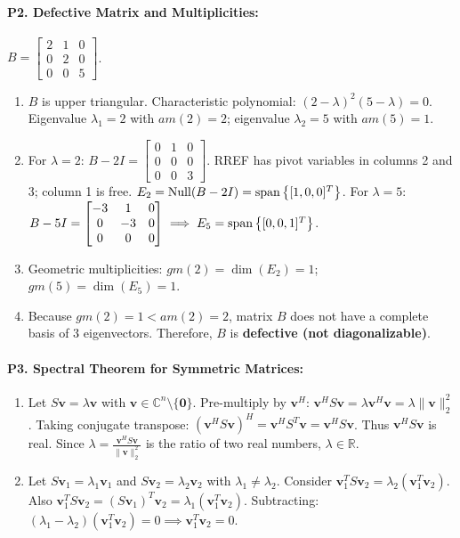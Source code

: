 \paragraph{P2. Defective Matrix and Multiplicities:}
$B = \begin{bmatrix} 2 & 1 & 0 \\ 0 & 2 & 0 \\ 0 & 0 & 5 \end{bmatrix}$.
\begin{enumerate}[label=(\alph*)]
    \item $B$ is upper triangular. Characteristic polynomial: $(2 - \lambda)^2 (5 - \lambda) = 0$.
    Eigenvalue $\lambda_1 = 2$ with $am(2) = 2$; eigenvalue $\lambda_2 = 5$ with $am(5) = 1$.
    \item For $\lambda = 2$: $B - 2I = \begin{bmatrix} 0 & 1 & 0 \\ 0 & 0 & 0 \\ 0 & 0 & 3 \end{bmatrix}$. RREF has pivot variables in columns 2 and 3; column 1 is free.
    $E_2 = \operatorname{Null}(B - 2I) = \operatorname{span}\left\{ [1, 0, 0]^T \right\}$.
    For $\lambda = 5$: $B - 5I = \begin{bmatrix} -3 & 1 & 0 \\ 0 & -3 & 0 \\ 0 & 0 & 0 \end{bmatrix} \implies E_5 = \operatorname{span}\left\{ [0, 0, 1]^T \right\}$.
    \item Geometric multiplicities: $gm(2) = \dim(E_2) = 1$; $gm(5) = \dim(E_5) = 1$.
    \item Because $gm(2) = 1 < am(2) = 2$, matrix $B$ does not have a complete basis of 3 eigenvectors. Therefore, $B$ is \textbf{defective (not diagonalizable)}.
\end{enumerate}

\paragraph{P3. Spectral Theorem for Symmetric Matrices:}
\begin{enumerate}[label=(\alph*)]
    \item Let $S\mathbf{v} = \lambda \mathbf{v}$ with $\mathbf{v} \in \mathbb{C}^n \setminus \{\mathbf{0}\}$.
    Pre-multiply by $\mathbf{v}^H$: $\mathbf{v}^H S \mathbf{v} = \lambda \mathbf{v}^H \mathbf{v} = \lambda \|\mathbf{v}\|_2^2$.
    Taking conjugate transpose: $(\mathbf{v}^H S \mathbf{v})^H = \mathbf{v}^H S^T \mathbf{v} = \mathbf{v}^H S \mathbf{v}$.
    Thus $\mathbf{v}^H S \mathbf{v}$ is real. Since $\lambda = \frac{\mathbf{v}^H S \mathbf{v}}{\|\mathbf{v}\|_2^2}$ is the ratio of two real numbers, $\lambda \in \mathbb{R}$.
    \item Let $S\mathbf{v}_1 = \lambda_1 \mathbf{v}_1$ and $S\mathbf{v}_2 = \lambda_2 \mathbf{v}_2$ with $\lambda_1 \ne \lambda_2$.
    Consider $\mathbf{v}_1^T S \mathbf{v}_2 = \lambda_2 (\mathbf{v}_1^T \mathbf{v}_2)$.
    Also $\mathbf{v}_1^T S \mathbf{v}_2 = (S\mathbf{v}_1)^T \mathbf{v}_2 = \lambda_1 (\mathbf{v}_1^T \mathbf{v}_2)$.
    Subtracting: $(\lambda_1 - \lambda_2)(\mathbf{v}_1^T \mathbf{v}_2) = 0 \implies \mathbf{v}_1^T \mathbf{v}_2 = 0$.
\end{enumerate}

